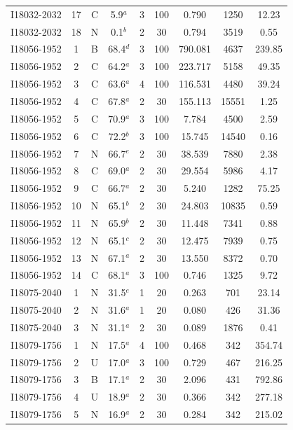 \begin{table}
\begin{tabular}{ccccccccc}
I18032-2032 & 17 & C & 5.9$^{a}$ & 3 & 100 & 0.790 & 1250 & 12.23 \\
I18032-2032 & 18 & N & 0.1$^{b}$ & 2 & 30 & 0.794 & 3519 & 0.55 \\
I18056-1952 & 1 & B & 68.4$^{d}$ & 3 & 100 & 790.081 & 4637 & 239.85 \\
I18056-1952 & 2 & C & 64.2$^{a}$ & 3 & 100 & 223.717 & 5158 & 49.35 \\
I18056-1952 & 3 & C & 63.6$^{a}$ & 4 & 100 & 116.531 & 4480 & 39.24 \\
I18056-1952 & 4 & C & 67.8$^{a}$ & 2 & 30 & 155.113 & 15551 & 1.25 \\
I18056-1952 & 5 & C & 70.9$^{a}$ & 3 & 100 & 7.784 & 4500 & 2.59 \\
I18056-1952 & 6 & C & 72.2$^{b}$ & 3 & 100 & 15.745 & 14540 & 0.16 \\
I18056-1952 & 7 & N & 66.7$^{e}$ & 2 & 30 & 38.539 & 7880 & 2.38 \\
I18056-1952 & 8 & C & 69.0$^{a}$ & 2 & 30 & 29.554 & 5986 & 4.17 \\
I18056-1952 & 9 & C & 66.7$^{a}$ & 2 & 30 & 5.240 & 1282 & 75.25 \\
I18056-1952 & 10 & N & 65.1$^{b}$ & 2 & 30 & 24.803 & 10835 & 0.59 \\
I18056-1952 & 11 & N & 65.9$^{b}$ & 2 & 30 & 11.448 & 7341 & 0.88 \\
I18056-1952 & 12 & N & 65.1$^{c}$ & 2 & 30 & 12.475 & 7939 & 0.75 \\
I18056-1952 & 13 & N & 67.1$^{a}$ & 2 & 30 & 13.550 & 8372 & 0.70 \\
I18056-1952 & 14 & C & 68.1$^{a}$ & 3 & 100 & 0.746 & 1325 & 9.72 \\
I18075-2040 & 1 & N & 31.5$^{e}$ & 1 & 20 & 0.263 & 701 & 23.14 \\
I18075-2040 & 2 & N & 31.6$^{a}$ & 1 & 20 & 0.080 & 426 & 31.36 \\
I18075-2040 & 3 & N & 31.1$^{a}$ & 2 & 30 & 0.089 & 1876 & 0.41 \\
I18079-1756 & 1 & N & 17.5$^{a}$ & 4 & 100 & 0.468 & 342 & 354.74 \\
I18079-1756 & 2 & U & 17.0$^{a}$ & 3 & 100 & 0.729 & 467 & 216.25 \\
I18079-1756 & 3 & B & 17.1$^{a}$ & 2 & 30 & 2.096 & 431 & 792.86 \\
I18079-1756 & 4 & U & 18.9$^{a}$ & 2 & 30 & 0.366 & 342 & 277.18 \\
I18079-1756 & 5 & N & 16.9$^{a}$ & 2 & 30 & 0.284 & 342 & 215.02 \\

\end{tabular}
\end{table}
